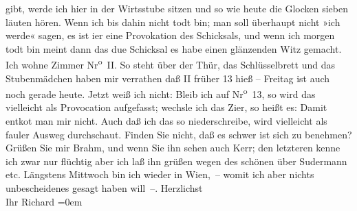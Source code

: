 \begin{ledgroupsized}[t]{13cm}
               gibt, werde ich hier in der Wirtsstube sitzen und so wie heute die Glocken sieben {\pb}läuten hören. Wenn ich bis dahin
               nicht todt bin; man soll überhaupt nicht »ich werde« sagen, es ist i{\geminationm}er eine Provokation des Schicksals, und wenn ich morgen
               todt bin meint dann das du{\geminationm}e Schicksal es habe einen
               glänzenden Witz gemacht.\pend
           \pstart
           {\pb}Ich wohne Zimmer Nr\textsuperscript{o} II. So steht über der Thür, das Schlüsselbrett und das
               Stubenmädchen haben mir verrathen daß II früher 13 hieß – Freitag ist auch noch
               gerade heute. Jetzt weiß ich nicht: Bleib ich auf Nr\textsuperscript{o} 13,
               so wird das vielleicht als Provocation aufgefasst; {\pb}wechsle ich das Zi{\geminationm}er, so heißt es: Damit entko{\geminationm}t man mir nicht. Auch daß ich das so niederschreibe,
               wird vielleicht als fauler Ausweg durchschaut. Finden Sie nicht, daß es schwer ist
               sich zu benehmen? Grüßen Sie mir Brahm, und
               wenn Sie ihn {\pb}sehen auch Kerr; den letzteren kenne ich zwar nur flüchtig
               aber ich laß ihn grüßen wegen des schönen \label{K_L00913_3v}\label{K_L00913_3h} über Sudermann etc.\pend
           \pstart
           Längstens Mittwoch bin ich wieder in Wien, – womit ich aber nichts unbescheidenes gesagt haben will –.\pend
           \pstart
           Herzlichst {\\[\baselineskip]}Ihr \spacefill\mbox{Richard}\pend
           \leftskip=0em{}
         
         \endnumbering{}\end{ledgroupsized}  \newcommand{\dateiname}{L00913}\newcommand{\titel}{Richard Beer-Hofmann an Arthur Schnitzler, 28. 4. 1899}\newcommand{\editorInnen}{Martin Anton Müller und Gerd-Hermann Susen}
      